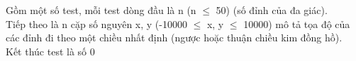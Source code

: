 Gồm một số test, mỗi test dòng đầu là n (n  $\le$  50) (số đỉnh của đa giác).   
\\   Tiếp theo là n cặp số nguyên x, y (-10000  $\le$  x, y  $\le$  10000) mô tả tọa độ của các đỉnh đi theo một chiều nhất định (ngược hoặc thuận chiều kim đồng hồ).   
\\   Kết thúc test là số 0  

\